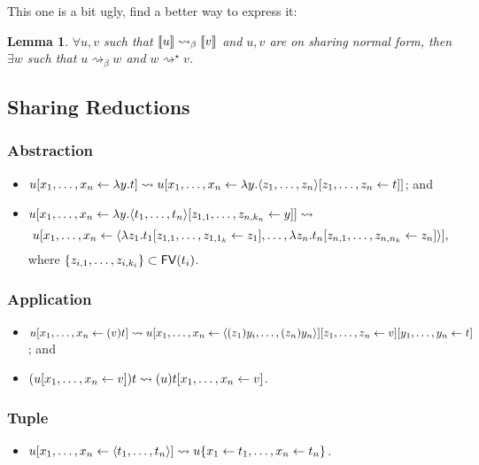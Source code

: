 \documentclass[11pt,a4paper]{article}
\theoremstyle{definition}
\theoremstyle{plain}
\newtheorem{lemma}[definition]{Lemma}
\theoremstyle{remark}
\begin{document}
This one is a bit ugly, find a better way to express it:

\begin{lemma}
$\forall u,v$ such that ${\llbracket{u}\rrbracket}\rightsquigarrow_\beta{\llbracket{v}\rrbracket}$ and $u,v$ are on sharing normal form, then $\exists w$ such that $u\rightsquigarrow_\beta w$ and $w\rightsquigarrow^\star v$.
\end{lemma}

\subsection{Sharing Reductions}

\subsubsection{Abstraction}

\begin{itemize}
\item ${{u}[{x_1},\dots,{x_n}\leftarrow{\lambda y. t}]} \rightsquigarrow
      {{u}[{x_1},\dots,{x_n}\leftarrow{\lambda y.{{{\langle{z_1},\dots,{z_n}{\rangle}}}[{z_1},\dots,{z_n}\leftarrow{t}]}}]}$; and
\item ${{u}[{x_1},\dots,{x_n}\leftarrow{\lambda y.{{{\langle{t_1},\dots,{t_n}{\rangle}}}[{z_{1,1}},\dots,{z_{n,k_n}}\leftarrow{y}]}}]} \rightsquigarrow$
      \[{{u}[{x_1},\dots,{x_n}\leftarrow{{\langle{\lambda z_1.{{t_1}[{z_{1,1}},\dots,{z_{1,1_k}}\leftarrow{z_1}]}},\dots,{\lambda z_n.{{t_n}[{z_{n,1}},\dots,{z_{n,n_k}}\leftarrow{z_n}]}}{\rangle}}}]},\]
where $\{z_{i,1},\dots,z_{i,k_i}\}\subset{\mathop{\mathsf{FV}}}(t_i)$.
\end{itemize}

\subsubsection{Application}

\begin{itemize}
\item ${{u}[{x_1},\dots,{x_n}\leftarrow{(v)t}]} \rightsquigarrow {{{{{{u}[{x_1},\dots,{x_n}\leftarrow{{\langle{(z_1)y_i},\dots,{(z_n)y_n}{\rangle}}}]}}[{z_1},\dots,{z_n}\leftarrow{v}]}}[{y_1},\dots,{y_n}\leftarrow{t}]}$; and
\item $({{u}[{x_1},\dots,{x_n}\leftarrow{v}]})t \rightsquigarrow {{(u)t}[{x_1},\dots,{x_n}\leftarrow{v}]}$.
\end{itemize}

\subsubsection{Tuple}

\begin{itemize}
\item ${{u}[{x_1},\dots,{x_n}\leftarrow{{\langle{t_1},\dots,{t_n}{\rangle}}}]} \rightsquigarrow u\{x_1\leftarrow t_1,\dots,x_n\leftarrow t_n\}$.
\end{itemize}
\end{document}
